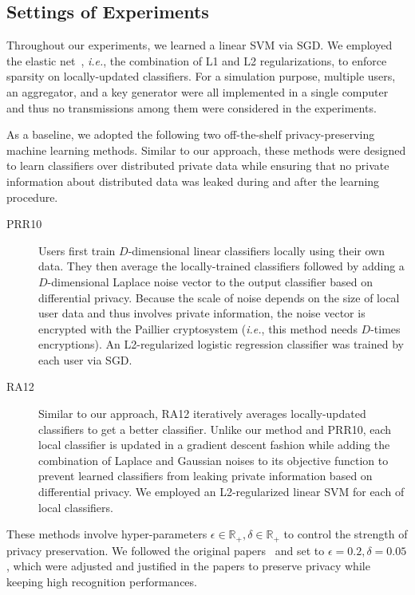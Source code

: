 \documentclass[10pt,twocolumn,letterpaper]{article}
\def\ie{{\it i.e.}}
\begin{document}
\subsection{Settings of Experiments}
\label{subsec:exp_setting}
Throughout our experiments, we learned a linear SVM via SGD. We employed the elastic net~\cite{Zou2005a}, \ie, the combination of L1 and L2 regularizations, to enforce sparsity on locally-updated classifiers. For a simulation purpose, multiple users, an aggregator, and a key generator were all implemented in a single computer and thus no transmissions among them were considered in the experiments.

As a baseline, we adopted the following two off-the-shelf privacy-preserving machine learning methods. Similar to our approach, these methods were designed to learn classifiers over distributed private data while ensuring that no private information about distributed data was leaked during and after the learning procedure.
\begin{description}
\item[PRR10~\cite{Pathak2010a}] Users first train $D$-dimensional linear classifiers locally using their own data. They then average the locally-trained classifiers followed by adding a $D$-dimensional Laplace noise vector to the output classifier based on differential privacy. Because the scale of noise depends on the size of local user data and thus involves private information, the noise vector is encrypted with the Paillier cryptosystem (\ie, this method needs $D$-times encryptions). An L2-regularized logistic regression classifier was trained by each user via SGD.
\item[RA12~\cite{Rajkumar2012a}] Similar to our approach, RA12 iteratively averages locally-updated classifiers to get a better classifier. Unlike our method and PRR10, each local classifier is updated in a gradient descent fashion while adding the combination of Laplace and Gaussian noises to its objective function to prevent learned classifiers from leaking private information based on differential privacy. We employed an L2-regularized linear SVM for each of local classifiers.
\end{description}
These methods involve hyper-parameters $\epsilon\in\mathbb{R}_+, \delta\in\mathbb{R}_+$ to control the strength of privacy preservation. We followed the original papers~\cite{Pathak2010a,Rajkumar2012a} and set to $\epsilon=0.2, \delta=0.05$, which were adjusted and justified in the papers to preserve privacy while keeping high recognition performances. 
\end{document}
